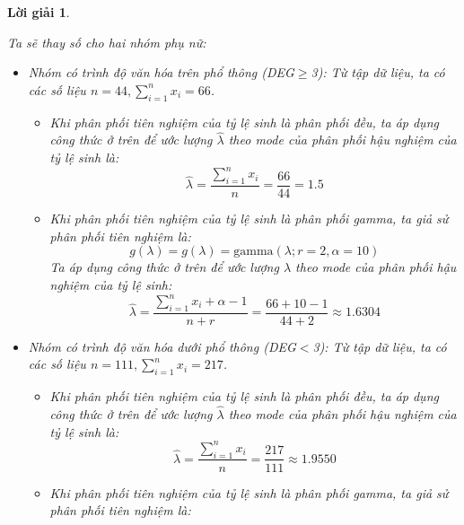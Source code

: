 \documentclass[14pt, a4paper]{article}
\theoremstyle{sltheorem}
\theoremstyle{soltheorem}
\newtheorem*{loigiai}{Lời giải}
\begin{document}
\begin{loigiai}
\begin{enumerate}
        Ta sẽ thay số cho hai nhóm phụ nữ:

        \begin{itemize}
            \item Nhóm có trình độ văn hóa trên phổ thông (DEG$\geq$3):
            Từ tập dữ liệu, ta có các số liệu $n=44, \sum_{i=1}^n x_i=66$.
            \begin{itemize}
                \item Khi phân phối tiên nghiệm của tỷ lệ sinh là phân phối đều, ta áp dụng công thức ở trên để ước lượng $\hat{\lambda}$ theo mode của phân phối hậu nghiệm của tỷ lệ sinh là:
                \begin{equation*}
                    \hat{\lambda} = \dfrac{\sum_{i=1}^n x_i}{n} = \dfrac{66}{44}=1.5
                \end{equation*}
                \item Khi phân phối tiên nghiệm của tỷ lệ sinh là phân phối gamma, ta giả sử phân phối tiên nghiệm là:
                \begin{equation*}
                    g(\lambda) = g(\lambda) = \text{gamma}(\lambda; r=2, \alpha=10)
                \end{equation*}
                Ta áp dụng công thức ở trên để ước lượng $\hat{\lambda}$ theo mode của phân phối hậu nghiệm của tỷ lệ sinh:
                \begin{equation*}
                    \hat{\lambda} = \dfrac{\sum_{i=1}^n x_i + \alpha - 1}{n + r} = \dfrac{66+10-1}{44 + 2}\approx 1.6304
                \end{equation*}
            \end{itemize}
            \item Nhóm có trình độ văn hóa dưới phổ thông (DEG$<$3):
            Từ tập dữ liệu, ta có các số liệu $n=111, \sum_{i=1}^n x_i=217$.
            \begin{itemize}
                \item Khi phân phối tiên nghiệm của tỷ lệ sinh là phân phối đều, ta áp dụng công thức ở trên để ước lượng $\hat{\lambda}$ theo mode của phân phối hậu nghiệm của tỷ lệ sinh là:
                \begin{equation*}
                    \hat{\lambda} = \dfrac{\sum_{i=1}^n x_i}{n} = \dfrac{217}{111}\approx 1.9550
                \end{equation*}
                \item Khi phân phối tiên nghiệm của tỷ lệ sinh là phân phối gamma, ta giả sử phân phối tiên nghiệm là:

\end{itemize}
\end{itemize}
\end{enumerate}
\end{loigiai}
\end{document}
